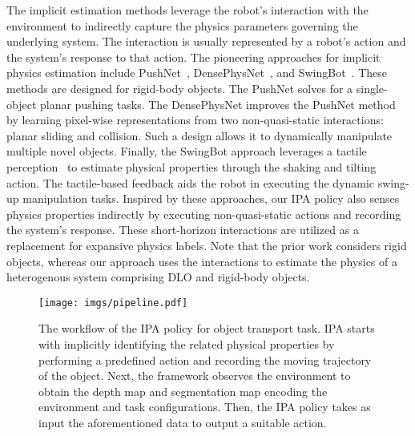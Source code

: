 The implicit estimation methods leverage the robot's interaction with the environment to indirectly capture the physics parameters governing the underlying system. The interaction is usually represented by a robot's action and the system's response to that action. The pioneering approaches for implicit physics estimation include PushNet~\cite{Li2018PushNetDP}, DensePhysNet~\cite{xu2019densephysnet}, and SwingBot~\cite{wang2020swingbot}. These methods are designed for rigid-body objects. The PushNet solves for a single-object planar pushing tasks. The DensePhysNet improves the PushNet method by learning pixel-wise representations from two non-quasi-static interactions: planar sliding and collision. Such a design allows it to dynamically manipulate multiple novel objects. Finally, the SwingBot approach leverages a tactile perception~\cite{yuan2017gelsight} to estimate physical properties through the shaking and tilting action. The tactile-based feedback aids the robot in executing the dynamic swing-up manipulation tasks. Inspired by these approaches, our IPA policy also senses physics properties indirectly by executing non-quasi-static actions and recording the system's response. These short-horizon interactions are utilized as a replacement for expansive physics labels. Note that the prior work considers rigid objects, whereas our approach uses the interactions to estimate the physics of a heterogenous system comprising DLO and rigid-body objects.


\begin{figure*}[t]
\vspace{2.5mm}
    \texttt{[image: imgs/pipeline.pdf]}
    \caption{The workflow of the IPA policy for object transport task. IPA starts with implicitly identifying the related physical properties by performing a predefined action and recording the moving trajectory of the object. Next, the framework observes the environment to obtain the depth map and segmentation map encoding the environment and task configurations. Then, the IPA policy takes as input the aforementioned data to output a suitable action.}
    \label{fig:pipeline}
\vspace{-4.5mm}
\end{figure*}